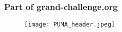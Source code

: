 \documentclass[../main.tex]{subfiles}
\begin{document}
\frame{\titlepage}

\begin{frame}
    \frametitle{Part of grand-challenge.org}

    \begin{figure}[h]
        \centering
        \texttt{[image: PUMA\_header.jpeg]}
    \end{figure}

\end{frame}
\end{document}
